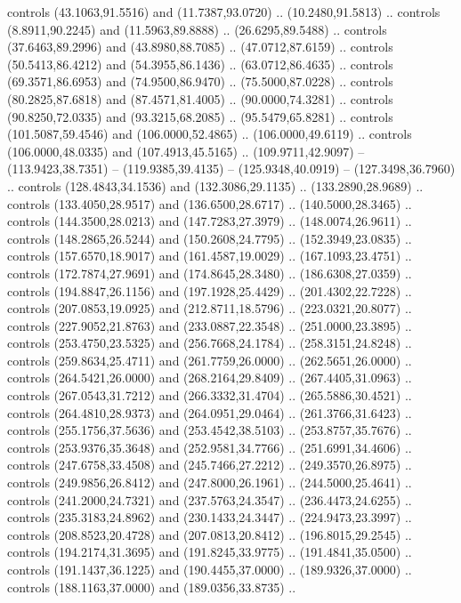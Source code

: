   controls (43.1063,91.5516) and (11.7387,93.0720) .. (10.2480,91.5813) ..
  controls (8.8911,90.2245) and (11.5963,89.8888) .. (26.6295,89.5488) ..
  controls (37.6463,89.2996) and (43.8980,88.7085) .. (47.0712,87.6159) ..
  controls (50.5413,86.4212) and (54.3955,86.1436) .. (63.0712,86.4635) ..
  controls (69.3571,86.6953) and (74.9500,86.9470) .. (75.5000,87.0228) ..
  controls (80.2825,87.6818) and (87.4571,81.4005) .. (90.0000,74.3281) ..
  controls (90.8250,72.0335) and (93.3215,68.2085) .. (95.5479,65.8281) ..
  controls (101.5087,59.4546) and (106.0000,52.4865) .. (106.0000,49.6119) ..
  controls (106.0000,48.0335) and (107.4913,45.5165) .. (109.9711,42.9097) --
  (113.9423,38.7351) -- (119.9385,39.4135) -- (125.9348,40.0919) --
  (127.3498,36.7960) .. controls (128.4843,34.1536) and (132.3086,29.1135) ..
  (133.2890,28.9689) .. controls (133.4050,28.9517) and (136.6500,28.6717) ..
  (140.5000,28.3465) .. controls (144.3500,28.0213) and (147.7283,27.3979) ..
  (148.0074,26.9611) .. controls (148.2865,26.5244) and (150.2608,24.7795) ..
  (152.3949,23.0835) .. controls (157.6570,18.9017) and (161.4587,19.0029) ..
  (167.1093,23.4751) .. controls (172.7874,27.9691) and (174.8645,28.3480) ..
  (186.6308,27.0359) .. controls (194.8847,26.1156) and (197.1928,25.4429) ..
  (201.4302,22.7228) .. controls (207.0853,19.0925) and (212.8711,18.5796) ..
  (223.0321,20.8077) .. controls (227.9052,21.8763) and (233.0887,22.3548) ..
  (251.0000,23.3895) .. controls (253.4750,23.5325) and (256.7668,24.1784) ..
  (258.3151,24.8248) .. controls (259.8634,25.4711) and (261.7759,26.0000) ..
  (262.5651,26.0000) .. controls (264.5421,26.0000) and (268.2164,29.8409) ..
  (267.4405,31.0963) .. controls (267.0543,31.7212) and (266.3332,31.4704) ..
  (265.5886,30.4521) .. controls (264.4810,28.9373) and (264.0951,29.0464) ..
  (261.3766,31.6423) .. controls (255.1756,37.5636) and (253.4542,38.5103) ..
  (253.8757,35.7676) .. controls (253.9376,35.3648) and (252.9581,34.7766) ..
  (251.6991,34.4606) .. controls (247.6758,33.4508) and (245.7466,27.2212) ..
  (249.3570,26.8975) .. controls (249.9856,26.8412) and (247.8000,26.1961) ..
  (244.5000,25.4641) .. controls (241.2000,24.7321) and (237.5763,24.3547) ..
  (236.4473,24.6255) .. controls (235.3183,24.8962) and (230.1433,24.3447) ..
  (224.9473,23.3997) .. controls (208.8523,20.4728) and (207.0813,20.8412) ..
  (196.8015,29.2545) .. controls (194.2174,31.3695) and (191.8245,33.9775) ..
  (191.4841,35.0500) .. controls (191.1437,36.1225) and (190.4455,37.0000) ..
  (189.9326,37.0000) .. controls (188.1163,37.0000) and (189.0356,33.8735) ..
